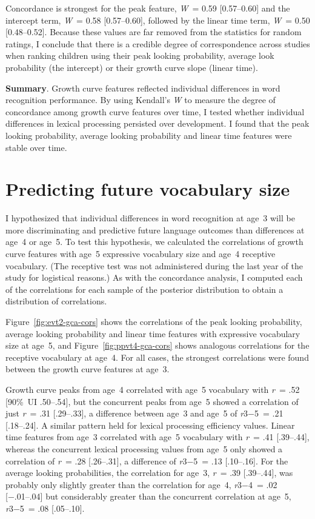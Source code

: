 \documentclass [11pt, proquest] {uwthesis}[2015/03/03]
\begin{document}
Concordance is strongest for the peak feature, \emph{W}~= 0.59
{[}0.57--0.60{]} and the intercept term, \emph{W}~= 0.58
{[}0.57--0.60{]}, followed by the linear time term, \emph{W}~= 0.50
{[}0.48--0.52{]}. Because these values are far removed from the
statistics for random ratings, I conclude that there is a credible
degree of correspondence across studies when ranking children using
their peak looking probability, average look probability (the intercept)
or their growth curve slope (linear time).

\textbf{Summary}. Growth curve features reflected individual differences
in word recognition performance. By using Kendall's \emph{W} to measure
the degree of concordance among growth curve features over time, I
tested whether individual differences in lexical processing persisted
over development. I found that the peak looking probability, average
looking probability and linear time features were stable over time.

\section{Predicting future vocabulary
size}\label{predicting-future-vocabulary-size}

I hypothesized that individual differences in word recognition at age~3
will be more discriminating and predictive future language outcomes than
differences at age~4 or age~5. To test this hypothesis, we calculated
the correlations of growth curve features with age~5 expressive
vocabulary size and age~4 receptive vocabulary. (The receptive test was
not administered during the last year of the study for logistical
reasons.) As with the concordance analysis, I computed each of the
correlations for each sample of the posterior distribution to obtain a
distribution of correlations.

Figure~\ref{fig:evt2-gca-cors} shows the correlations of the peak
looking probability, average looking probability and linear time
features with expressive vocabulary size at age~5, and
Figure~\ref{fig:ppvt4-gca-cors} shows analogous correlations for the
receptive vocabulary at age~4. For all cases, the strongest correlations
were found between the growth curve features at age~3.

Growth curve peaks from age~4 correlated with age~5 vocabulary with
\emph{r}~= .52 {[}90\%~UI .50--.54{]}, but the concurrent peaks from
age~5 showed a correlation of just \emph{r}~= .31 {[}.29--.33{]}, a
difference between age~3 and age~5 of \emph{r}3−5~= .21 {[}.18--.24{]}.
A similar pattern held for lexical processing efficiency values. Linear
time features from age~3 correlated with age~5 vocabulary with
\emph{r}~= .41 {[}.39--.44{]}, whereas the concurrent lexical processing
values from age~5 only showed a correlation of \emph{r}~= .28
{[}.26--.31{]}, a difference of \emph{r}3−5~= .13 {[}.10--.16{]}. For
the average looking probabilities, the correlation for age~3, \emph{r}~=
.39 {[}.39--.44{]}, was probably only slightly greater than the
correlation for age~4, \emph{r}3−4~= .02 {[}−.01--.04{]} but
considerably greater than the concurrent correlation at age~5,
\emph{r}3−5~= .08 {[}.05--.10{]}.
\end{document}
